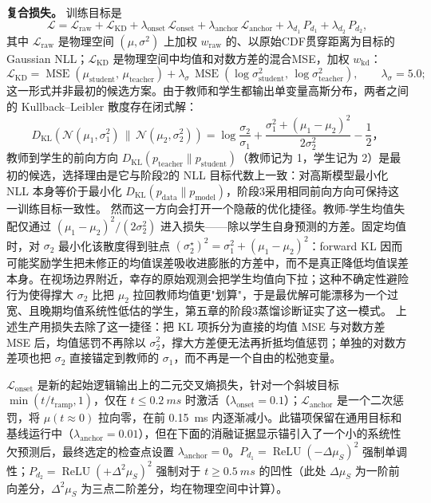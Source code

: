 \textbf{复合损失。} 训练目标是
\[
\mathcal{L} = \mathcal{L}_{\mathrm{raw}} + \mathcal{L}_{\mathrm{KD}} + \lambda_{\mathrm{onset}}\,\mathcal{L}_{\mathrm{onset}} + \lambda_{\mathrm{anchor}}\,\mathcal{L}_{\mathrm{anchor}} + \lambda_{d_1}\,P_{d_1} + \lambda_{d_2}\,P_{d_2},
\]
其中 $\mathcal{L}_{\mathrm{raw}}$ 是物理空间 $(\mu,\sigma^2)$ 上加权 $w_{\mathrm{raw}}$ 的、以原始CDF贯穿距离为目标的 Gaussian NLL；$\mathcal{L}_{\mathrm{KD}}$ 是物理空间中均值和对数方差的混合MSE，加权 $w_{\mathrm{kd}}$：
\[
\mathcal{L}_{\mathrm{KD}} = \operatorname{MSE}(\mu_{\mathrm{student}},\,\mu_{\mathrm{teacher}}) + \lambda_\sigma\,\operatorname{MSE}(\log\sigma^2_{\mathrm{student}},\,\log\sigma^2_{\mathrm{teacher}}),\qquad \lambda_\sigma = 5.0;
\]
这一形式并非最初的候选方案。由于教师和学生都输出单变量高斯分布，两者之间的 Kullback--Leibler 散度存在闭式解：
\[
D_{\mathrm{KL}}\!\left(\mathcal{N}(\mu_1,\sigma_1^2)\,\|\,\mathcal{N}(\mu_2,\sigma_2^2)\right)
=\log\frac{\sigma_2}{\sigma_1}+\frac{\sigma_1^2+(\mu_1-\mu_2)^2}{2\sigma_2^2}-\frac{1}{2}，
\]
教师到学生的前向方向 \(D_{\mathrm{KL}}(p_{\mathrm{teacher}}\|p_{\mathrm{student}})\)（教师记为 1，学生记为 2）是最初的候选，选择理由是它与阶段2的 NLL 目标代数上一致：对高斯模型最小化 NLL 本身等价于最小化 \(D_{\mathrm{KL}}(p_{\mathrm{data}}\|p_{\mathrm{model}})\)，阶段3采用相同前向方向可保持这一训练目标一致性。
然而这一方向会打开一个隐蔽的优化捷径。教师-学生均值失配仅通过 \((\mu_1-\mu_2)^2/(2\sigma_2^2)\) 进入损失——除以学生自身预测的方差。固定均值时，对 \(\sigma_2\) 最小化该散度得到驻点 \((\sigma_2^{\star})^{2}=\sigma_1^{2}+(\mu_1-\mu_2)^{2}\)：forward KL 因而可能奖励学生把未修正的均值误差吸收进膨胀的方差中，而不是真正降低均值误差本身。在视场边界附近，幸存的原始观测会把学生均值向下拉；这种不确定性避险行为使得撑大 \(\sigma_2\) 比把 \(\mu_2\) 拉回教师均值更"划算"，于是最优解可能漂移为一个过宽、且晚期均值系统性低估的学生，第五章的阶段3蒸馏诊断证实了这一模式。
上述生产用损失去除了这一捷径：把 KL 项拆分为直接的均值 MSE 与对数方差 MSE 后，均值惩罚不再除以 \(\sigma_2^2\)，撑大方差便无法再折抵均值惩罚；单独的对数方差项也把 \(\sigma_2\) 直接锚定到教师的 \(\sigma_1\)，而不再是一个自由的松弛变量。

$\mathcal{L}_{\mathrm{onset}}$ 是新的起始逻辑输出上的二元交叉熵损失，针对一个斜坡目标 $\min(t/t_{\mathrm{ramp}},1)$，仅在 $t\leq\SI{0.2}{ms}$ 时激活（$\lambda_{\mathrm{onset}}=0.1$）；$\mathcal{L}_{\mathrm{anchor}}$ 是一个二次惩罚，将 $\mu(t\approx0)$ 拉向零，在前 \SI{0.15}{ms} 内逐渐减小。此锚项保留在通用目标和基线运行中（$\lambda_{\mathrm{anchor}}=0.01$），但在下面的消融证据显示锚引入了一个小的系统性欠预测后，最终选定的检查点设置 $\lambda_{\mathrm{anchor}}=0$。$P_{d_1}=\operatorname{ReLU}(-\Delta\mu_S)^2$ 强制单调性；$P_{d_2}=\operatorname{ReLU}(+\Delta^2\mu_S)^2$ 强制对于 $t\geq\SI{0.5}{ms}$ 的凹性（此处 $\Delta\mu_S$ 为一阶前向差分，$\Delta^2\mu_S$ 为三点二阶差分，均在物理空间中计算）。

